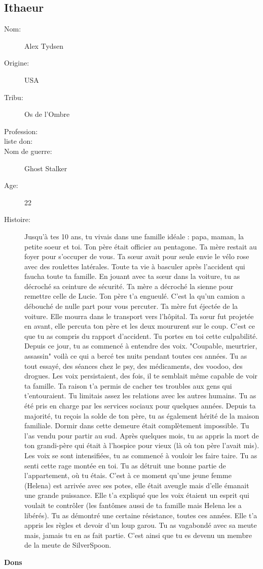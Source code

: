 \documentclass[oneside,12pt]{book}
\begin{document}
\begin{flushleft}
\section{Ithaeur}
\begin{description}
\item[Nom:]{Alex Tydsen}
\item[Origine:]{USA}
\item[Tribu:]{Os de l'Ombre}
\item[Profession:]{}
\item[liste don:]{}
\item[Nom de guerre:]{Ghost Stalker}
\item[Age:]{22}
\item[Histoire:]{ 
 Jusqu'à tes 10 ans, tu vivais dans une famille idéale : papa, maman, la petite soeur et toi. Ton père était officier au pentagone. Ta mère restait au foyer pour s'occuper de vous. Ta sœur avait pour seule envie le vélo rose avec des roulettes latérales.  
Toute ta vie à basculer après l'accident qui faucha toute ta famille. En jouant avec ta sœur dans la voiture, tu as décroché sa ceinture de sécurité. 
Ta mère a décroché la sienne pour remettre celle de Lucie. 
Ton père t'a engueulé. C'est la qu'un camion a débouché de nulle part pour vous percuter. 
Ta mère fut éjectée de la voiture. 
Elle mourra dans le transport vers l’hôpital. 
Ta sœur fut projetée en avant, elle percuta ton père et les deux moururent sur le coup.
C'est ce que tu as compris du rapport d'accident. Tu portes en toi cette culpabilité. 
Depuis ce jour, tu as commencé à entendre des voix. "Coupable, meurtrier, assassin" voilà ce qui a bercé tes nuits pendant toutes ces années. 
Tu as tout essayé, des séances chez le psy, des médicaments, des voodoo, des drogues. Les voix persistaient, des fois, il te semblait même capable de voir ta famille. 
Ta raison t'a permis de cacher tes troubles aux gens qui t'entouraient. Tu limitais assez les relations avec les autres humains. 
Tu as été pris en charge par les services sociaux pour quelques années. Depuis ta majorité, tu reçois la solde de ton père, tu as également hérité de la maison familiale. 
Dormir dans cette demeure était complètement impossible. Tu l'as vendu pour partir au sud. 
Après quelques mois, tu as appris la mort de ton grandi-père qui était à l'hospice pour vieux (là où ton père l'avait mis). 
Les voix se sont intensifiées, tu as commencé à vouloir les faire taire. Tu as senti cette rage montée en toi.
Tu as détruit une bonne partie de l'appartement, où tu étais. 
C'est à ce moment qu'une jeune femme (Helena) est arrivée avec ses potes, elle était aveugle mais d'elle émanait une grande puissance. 
Elle t'a expliqué que les voix étaient un esprit qui voulait te contrôler (les fantômes aussi de ta famille mais Helena les a libérés). Tu as démontré une certaine résistance, toutes ces années. Elle t'a appris les règles et devoir d'un loup garou. Tu as vagabondé avec sa meute mais, jamais tu en as fait partie. 
C'est ainsi que tu es devenu un membre de la meute de SilverSpoon.
}
\end{description}
\clearpage
\textbf{\large Dons} 
\vspace{0.5cm}


\end{flushleft}
\end{document}
